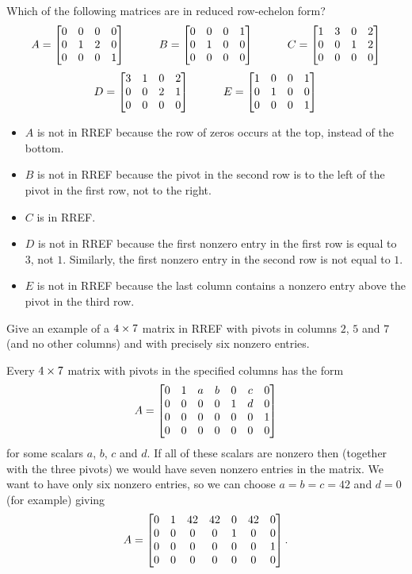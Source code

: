 \documentclass[a4paper]{amsart}
\renewenvironment{solution}{\SolutionInline}{\endSolutionInline}
\begin{document}
\begin{exercise}\label{ex-which-rref-i}
 Which of the following matrices are in reduced row-echelon form?
 \[ 
  A = \left[\begin{matrix} 0&0&0&0 \\ 0&1&2&0 \\ 0&0&0&1 \end{matrix}\right] \hspace{3em}
  B = \left[\begin{matrix} 0&0&0&1 \\ 0&1&0&0 \\ 0&0&0&0 \end{matrix}\right] \hspace{3em}
  C = \left[\begin{matrix} 1&3&0&2 \\ 0&0&1&2 \\ 0&0&0&0 \end{matrix}\right]
 \] \[
  D = \left[\begin{matrix} 3&1&0&2 \\ 0&0&2&1 \\ 0&0&0&0 \end{matrix}\right] \hspace{3em}
  E = \left[\begin{matrix} 1&0&0&1 \\ 0&1&0&0 \\ 0&0&0&1 \end{matrix}\right]
 \]
\end{exercise}
\begin{solution}
 \begin{itemize}
  \item $A$ is not in RREF because the row of zeros occurs at the top,
   instead of the bottom.
  \item $B$ is not in RREF because the pivot in the second row is to
   the left of the pivot in the first row, not to the right.
  \item $C$ is in RREF.
  \item $D$ is not in RREF because the first nonzero entry in the
   first row is equal to $3$, not $1$.  Similarly, the first nonzero
   entry in the second row is not equal to $1$.
  \item $E$ is not in RREF because the last column contains a nonzero
   entry above the pivot in the third row.
 \end{itemize}
\end{solution}

\begin{exercise}\label{ex-rref-eg-i}
 Give an example of a $4\times 7$ matrix in RREF with pivots in columns
 $2$, $5$ and $7$ (and no other columns) and with precisely six
 nonzero entries.
\end{exercise}
\begin{solution}
 Every $4\times 7$ matrix with pivots in the specified columns has the
 form 
 \[ A = 
    \left[\begin{matrix} 0 & 1 & a & b & 0 & c & 0 \\
         0 & 0 & 0 & 0 & 1 & d & 0 \\
         0 & 0 & 0 & 0 & 0 & 0 & 1 \\
         0 & 0 & 0 & 0 & 0 & 0 & 0 \end{matrix}\right]
 \]
 for some scalars $a$, $b$, $c$ and $d$.  If all of these scalars are
 nonzero then (together with the three pivots) we would have seven
 nonzero entries in the matrix.  We want to have only six nonzero
 entries, so we can choose $a=b=c=42$ and $d=0$ (for example) giving 
 \[ A = 
    \left[\begin{matrix} 0 & 1 & 42 & 42 & 0 & 42 & 0 \\
         0 & 0 &  0 &  0 & 1 &  0 & 0 \\
         0 & 0 &  0 &  0 & 0 &  0 & 1 \\
         0 & 0 &  0 &  0 & 0 &  0 & 0 \end{matrix}\right].
 \]
\end{solution}
\end{document}
